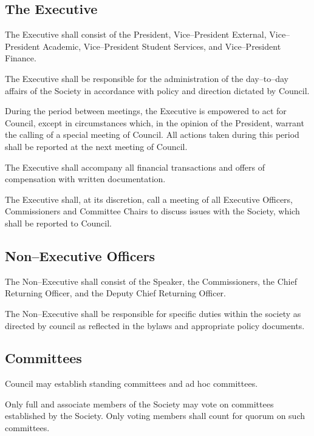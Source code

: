 \subsection{The Executive}
	\begin{longenum}[label*=\thesubsection.\arabic*., align=left]
	\item The Executive shall consist of the President, Vice--President External, Vice--President Academic, Vice--President Student Services, and Vice--President Finance. 
    \item The Executive shall be responsible for the administration of the day--to--day affairs of the Society in accordance with policy and direction dictated by Council.
    \item During the period between meetings, the Executive is empowered to act for Council, except in circumstances which, in the opinion of the President, warrant the calling of a special meeting of Council. All actions taken during this period shall be reported at the next meeting of Council.
    \item The Executive shall accompany all financial transactions and offers of compensation with written documentation.
        \item The Executive shall, at its discretion, call a
        meeting of all Executive Officers, Commissioners and Committee Chairs to discuss issues with the Society, which shall be reported to Council. 

 
\end{longenum}
\subsection{Non--Executive Officers}
	\begin{longenum}[label*=\thesubsection.\arabic*., align=left]
	\item The Non--Executive shall consist of the Speaker, the Commissioners, the Chief Returning Officer, and the Deputy Chief Returning Officer. 
    \item The Non--Executive shall be responsible for specific duties within the society as directed by council as reflected in the bylaws and appropriate policy documents.
\end{longenum}
\subsection{Committees}
	\begin{longenum}[label*=\thesubsection.\arabic*., align=left]
	\item Council may establish standing committees and ad hoc committees.
    \item Only full and associate members of the Society may vote on committees established by the Society. Only voting members shall count for quorum on such committees.
\end{longenum}
